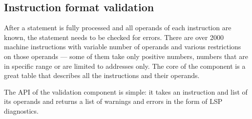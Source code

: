 \subsection{Instruction format validation}
\label{checker}
After a statement is fully processed and all operands of each instruction are known, the statement needs to be checked for errors. There are over 2000 machine instructions with variable number of operands and various restrictions on those operands --- some of them take only positive numbers, numbers that are in specific range or are limited to addresses only. The core of the component is a great table that describes all the instructions and their operands.

The API of the validation component is simple: it takes an instruction and list of its operands and returns a list of warnings and errors in the form of LSP diagnostics.